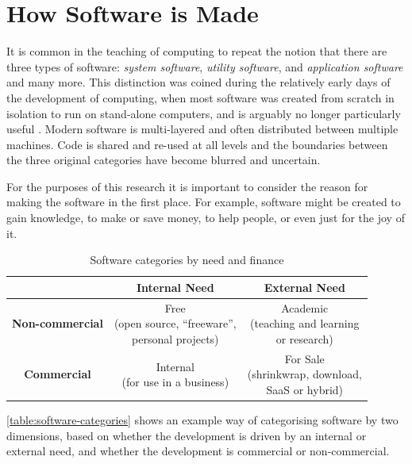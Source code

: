 \section{How Software is Made}
\label{section:context development}

It is common in the teaching of computing to repeat the notion that there are three types of software: \emph{system software}, \emph{utility software}, and \emph{application software} \citep{FuturelearnTypes} \citep{Gupta2023a} \citep{Various2023} and many more. This distinction was coined during the relatively early days of the development of computing, when most software was created from scratch in isolation to run on stand-alone computers, and is arguably no longer particularly useful \citep{Hislop2009}. Modern software is multi-layered and often distributed between multiple machines. Code is shared and re-used at all levels and the boundaries between the three original categories have become blurred and uncertain.

For the purposes of this research it is important to consider the reason for making the software in the first place. For example, software might be created to gain knowledge, to make or save money, to help people, or even just for the joy of it.

\begin{table}
\centering
\begin{tabular}{ c | c | c }
  & \textbf{Internal Need} & \textbf{External Need} \\
  \hline
  \textbf{Non-commercial} & \makecell{Free \\ (open source, \enquote{freeware}, \\ personal projects)} & \makecell{Academic \\ (teaching and learning \\ or research)}\\
  \hline
  \textbf{Commercial} & \makecell{Internal\\(for use in a business)} & \makecell{For Sale \\ (shrinkwrap, download, \\ SaaS or hybrid)}\\
  \hline
\end{tabular}
\caption{Software categories by need and finance\label{table:software-categories}}
\end{table}

\autoref{table:software-categories} shows an example way of categorising software by two dimensions, based on whether the development is driven by an internal or external need, and whether the development is commercial or non-commercial.

